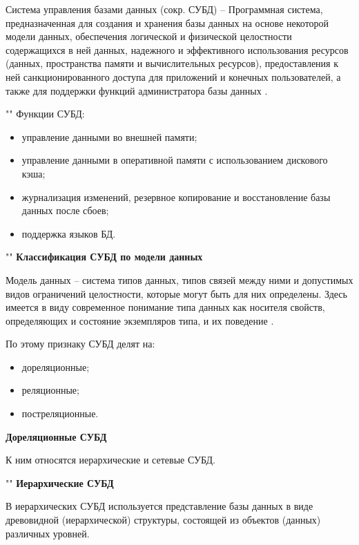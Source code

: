\documentclass[a4paper]{bmstu}
\begin{document}
Система управления базами данных (сокр. СУБД) -- Программная система, предназначенная для создания и хранения базы данных на основе некоторой модели данных, обеспечения логической и физической целостности содержащихся в ней данных, надежного и эффективного использования ресурсов (данных, пространства памяти и вычислительных ресурсов), предоставления к ней санкционированного доступа для приложений и конечных пользователей, а также для поддержки 
функций администратора базы данных \cite{kogal}.

""\newline
Функции СУБД:

\begin{itemize}
	\setlength\itemsep{0.01em}
	\item управление данными во внешней памяти;
	\item управление данными в оперативной памяти с использованием дискового кэша;
	\item журнализация изменений, резервное копирование и восстановление базы данных после сбоев;
	\item поддержка языков БД.
\end{itemize}

""\newline
\noindent\textbf{Классификация СУБД по модели данных}

Модель данных --  система типов данных, типов связей между ними и допустимых видов ограничений целостности, которые могут быть для них определены. Здесь имеется в виду современное понимание типа данных как носителя свойств, определяющих и состояние экземпляров типа, и их поведение \cite{kogal}.

По этому признаку СУБД делят на:

\begin{itemize}
	\setlength\itemsep{0.01em}
	\item дореляционные;
	\item реляционные;
	\item постреляционные.
\end{itemize}


\noindent\textbf{Дореляционные СУБД}

К ним относятся иерархические и сетевые СУБД.

""\newline
\noindent\textbf{Иерархические СУБД}

В иерархических СУБД используется представление базы данных в виде древовидной (иерархической) структуры, состоящей из объектов (данных) различных уровней.
\end{document}
